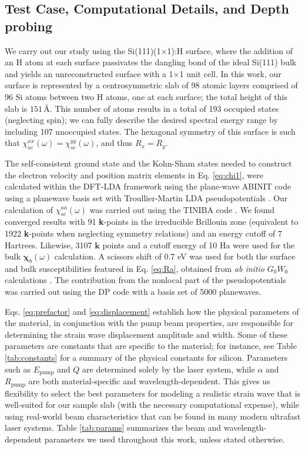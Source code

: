 \documentclass[aps,prb,10pt,showkeys,letterpaper,notitlepage,twocolumn]{revtex4-1}
\begin{document}
\subsection{Test Case, Computational Details, and Depth probing}

We carry out our study using the Si(111)(1$\times$1):H surface, where the
addition of an H atom at each surface passivates the dangling bond of the ideal
Si(111) bulk and yields an unreconstructed surface with a 1$\times$1 unit cell.
In this work, our surface is represented by a centrosymmetric slab of 98 atomic
layers comprised of 96 Si atoms between two H atoms, one at each surface; the
total height of this slab is $151$\,\r{A}. This number of atoms results in a
total of 193 occupied states (neglecting spin); we can fully describe the
desired spectral energy range by including 107 unoccupied states. The hexagonal
symmetry of this surface is such that $\chi^{xx}_{sc}(\omega) =
\chi^{yy}_{sc}(\omega)$, and thus $R_{x} = R_{y}$.

The self-consistent ground state and the Kohn-Sham states needed to construct
the electron velocity and position matrix elements in Eq. \eqref{eq:chi1}, were
calculated within the DFT-LDA framework using the plane-wave ABINIT code
\cite{gonzeCPS09, abinit} using a planewave basis set with Troullier-Martin LDA
pseudopotentials \cite{troullierPRB91}. Our calculation of
$\chi^{aa}_{sc}(\omega)$ was carried out using the TINIBA code \cite{tiniba}. We
found converged results with 91 \textbf{k}-points in the irreducible Brillouin
zone (equivalent to 1922 \textbf{k}-points when neglecting symmetry relations)
and an energy cutoff of 7 Hartrees. Likewise, 3107 $\mathbf{k}$ points and a
cutoff energy of 10 Ha were used for the bulk
$\boldsymbol{\chi}^{~}_{b}(\omega)$ calculation. A scissors shift of 0.7 eV was
{\color{red}%
used for both the surface and bulk susceptibilities featured in Eq.
\eqref{eq:Ra}, obtained from \emph{ab initio} $G_{0}W_{0}$ calculations
\cite{liPRB10}.
}%
The contribution from the nonlocal part of the pseudopotentials
\cite{andersonPRB15} was carried out using the DP \cite{olevanoDP, reiningEXC}
code with a basis set of 5000 planewaves.

Eqs. \eqref{eq:prefactor} and \eqref{eq:displacement} establish how the physical
parameters of the material, in conjunction with the pump beam properties, are
responsible for determining the strain wave displacement amplitude and width.
Some of these parameters are constants that are specific to the material; for
instance, see Table \ref{tab:constants} for a summary of the physical constants
for silicon. Parameters such as $E_{\mathrm{pump}}$ and $Q$ are determined
solely by the laser system, while $\alpha$ and $R_{\mathrm{pump}}$ are both
material-specific and wavelength-dependent. This gives us flexibility to select
the best parameters for modeling a realistic strain wave that is well-suited for
our sample slab (with the necessary computational expense), while using
real-world beam characteristics that can be found in many modern ultrafast laser
systems. Table \ref{tab:params} summarizes the beam and wavelength-dependent
parameters we used throughout this work, unless stated otherwise.
\end{document}
